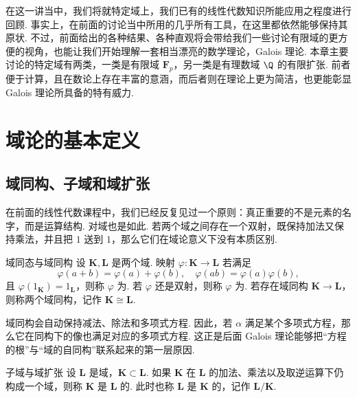 
在这一讲当中，我们将就特定域上，我们已有的线性代数知识所能应用之程度进行回顾. 事实上，在前面的讨论当中所用的几乎所有工具，在这里都依然能够保持其原状. 不过，前面给出的各种结果、各种直观将会带给我们一些讨论有限域的更方便的视角，也能让我们开始理解一套相当漂亮的数学理论，Galois 理论. 本章主要讨论的特定域有两类，一类是有限域 $\mathbf{F}_p$，另一类是有理数域 $\Q$ 的有限扩张. 前者便于计算，且在数论上存在丰富的意涵，而后者则在理论上更为简洁，也更能彰显 Galois 理论所具备的特有威力.

\section{域论的基本定义}

\subsection{域同构、子域和域扩张}

在前面的线性代数课程中，我们已经反复见过一个原则：真正重要的不是元素的名字，而是运算结构. 对域也是如此. 若两个域之间存在一个双射，既保持加法又保持乘法，并且把 $1$ 送到 $1$，那么它们在域论意义下没有本质区别.

\begin{definition}{域同态与域同构}{}
    设 $\mathbf{K},\mathbf{L}$ 是两个域. 映射 $\varphi\colon \mathbf{K}\to\mathbf{L}$ 若满足
    \[
        \varphi(a+b)=\varphi(a)+\varphi(b),\quad
        \varphi(ab)=\varphi(a)\varphi(b),
    \]
    且 $\varphi(1_\mathbf{K})=1_\mathbf{L}$，则称 $\varphi$ 为. 若 $\varphi$ 还是双射，则称 $\varphi$ 为. 若存在域同构 $\mathbf{K}\to\mathbf{L}$，则称两个域同构，记作 $\mathbf{K}\cong\mathbf{L}$.
\end{definition}

域同构会自动保持减法、除法和多项式方程. 因此，若 $\alpha$ 满足某个多项式方程，那么它在同构下的像也满足对应的多项式方程. 这正是后面 Galois 理论能够把``方程的根''与``域的自同构''联系起来的第一层原因.

\begin{definition}{子域与域扩张}{}
    设 $\mathbf{L}$ 是域，$\mathbf{K}\subset\mathbf{L}$. 如果 $\mathbf{K}$ 在 $\mathbf{L}$ 的加法、乘法以及取逆运算下仍构成一个域，则称 $\mathbf{K}$ 是 $\mathbf{L}$ 的. 此时也称 $\mathbf{L}$ 是 $\mathbf{K}$ 的，记作 $\mathbf{L}/\mathbf{K}$.
\end{definition}

